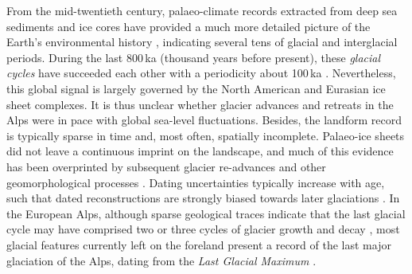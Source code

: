 \documentclass[tc, manuscript]{copernicus}
\begin{document}
    From the mid-twentieth
    century, palaeo-climate records extracted from deep sea sediments and
    ice cores have provided a much more detailed picture of the Earth's
    environmental history \citep[e.g.,][]{Emiliani.1955,
    Shackleton.Opdyke.1973, Dansgaard.etal.1993, Augustin.etal.2004},
    indicating several tens of glacial and interglacial periods. During the
    last 800\,ka (thousand years before present), these \emph{glacial cycles}
    have succeeded each other with a periodicity about 100\,ka \citep{Hays.etal.1976,
    Augustin.etal.2004}. Nevertheless, this global signal is largely governed
    by the North American and Eurasian ice sheet complexes. It is thus unclear
    whether glacier advances and retreats in the Alps were in pace with global
    sea-level fluctuations.
    Besides, the landform record is typically sparse in time and, most often,
    spatially incomplete. Palaeo-ice sheets did not leave a continuous imprint
    on the landscape, and much of this evidence has been overprinted by
    subsequent glacier re-advances and other geomorphological processes
    \citep[e.g.,][]{Kleman.1994, Kleman.etal.2006, Kleman.etal.2010}. Dating
    uncertainties typically increase with age, such that dated reconstructions
    are strongly biased towards later glaciations \citep{Heyman.etal.2011}.
    In the European Alps, although sparse
    geological traces indicate that the last glacial cycle may have comprised
    two or three cycles of glacier growth and decay \citep{Preusser.2004,
    Ivy-Ochs.etal.2008}, most glacial features currently left on the foreland
    present a record of the last major glaciation of the Alps, dating from the
    \emph{Last Glacial Maximum} \citep[LGM;][]{Ivy-Ochs.2015,
    Wirsig.etal.2016, Monegato.etal.2017}.
\end{document}
